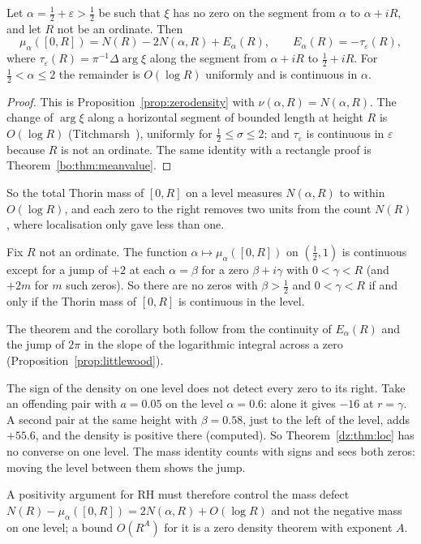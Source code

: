 \begin{theorem}\label{dz:thm:mass}
Let $\alpha=\frac12+\varepsilon>\frac12$ be such that $\xi$ has no zero on the segment from $\alpha$ to $\alpha+iR$, and let $R$ not be an ordinate. Then
\[
\mu_\alpha([0,R])=N(R)-2N(\alpha,R)+E_\alpha(R),\qquad E_\alpha(R)=-\tau_\varepsilon(R),
\]
where $\tau_\varepsilon(R)=\pi^{-1}\Delta\arg\xi$ along the segment from $\alpha+iR$ to $\frac12+iR$. For $\frac12<\alpha\le2$ the remainder is $O(\log R)$ uniformly and is continuous in $\alpha$.
\end{theorem}
\begin{proof}
This is Proposition~\ref{prop:zerodensity} with $\nu(\alpha,R)=N(\alpha,R)$. The change of $\arg\xi$ along a horizontal segment of bounded length at height $R$ is $O(\log R)$ (Titchmarsh~\cite[Section 9.4]{Titchmarsh}), uniformly for $\frac12\le\sigma\le2$; and $\tau_\varepsilon$ is continuous in $\varepsilon$ because $R$ is not an ordinate. The same identity with a rectangle proof is Theorem~\ref{bo:thm:meanvalue}.
\end{proof}
So the total Thorin mass of $[0,R]$ on a level measures $N(\alpha,R)$ to within $O(\log R)$, and each zero to the right removes two units from the count $N(R)$, where localisation only gave less than one.

\begin{corollary}\label{dz:cor:jump}
Fix $R$ not an ordinate. The function $\alpha\mapsto\mu_\alpha([0,R])$ on $(\frac12,1)$ is continuous except for a jump of $+2$ at each $\alpha=\beta$ for a zero $\beta+i\gamma$ with $0<\gamma<R$ (and $+2m$ for $m$ such zeros). So there are no zeros with $\beta>\frac12$ and $0<\gamma<R$ if and only if the Thorin mass of $[0,R]$ is continuous in the level.
\end{corollary}
The theorem and the corollary both follow from the continuity of $E_\alpha(R)$ and the jump of $2\pi$ in the slope of the logarithmic integral across a zero (Proposition~\ref{prop:littlewood}).

\begin{remark}[masking]\label{dz:rem:mask}
The sign of the density on one level does not detect every zero to its right. Take an offending pair with $a=0.05$ on the level $\alpha=0.6$: alone it gives $-16$ at $r=\gamma$. A second pair at the same height with $\beta=0.58$, just to the left of the level, adds $+55.6$, and the density is positive there (computed). So Theorem~\ref{dz:thm:loc} has no converse on one level. The mass identity counts with signs and sees both zeros: moving the level between them shows the jump.
\end{remark}
A positivity argument for RH must therefore control the mass defect $N(R)-\mu_\alpha([0,R])=2N(\alpha,R)+O(\log R)$ and not the negative mass on one level; a bound $O(R^A)$ for it is a zero density theorem with exponent $A$.

